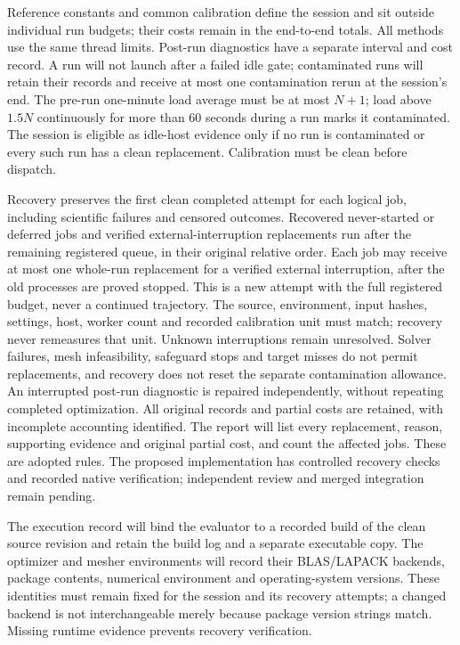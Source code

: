 Reference constants and common calibration define the session and sit outside
individual run budgets; their costs remain in the end-to-end totals.
All methods use the same thread limits. Post-run diagnostics have a separate
interval and cost record. A run will not launch after a failed idle gate; contaminated runs
will retain their records and receive at most one contamination rerun at the
session's end. The pre-run
one-minute load average must be at most $N+1$; load above $1.5N$ continuously
for more than 60 seconds during a run marks it contaminated. The session is
eligible as idle-host evidence only if no run is contaminated or every such
run has a clean replacement. Calibration must be clean before dispatch.

Recovery preserves the first clean completed attempt for each logical job,
including scientific failures and censored outcomes. Recovered never-started
or deferred jobs and verified external-interruption replacements run after
the remaining registered queue, in their original relative order. Each job
may receive at most one whole-run replacement for a verified external
interruption, after the old processes are proved stopped. This is a new
attempt with the full registered budget, never a continued trajectory.
The source, environment, input hashes, settings, host, worker count and
recorded calibration unit must match; recovery never remeasures that unit.
Unknown interruptions remain unresolved. Solver failures, mesh infeasibility,
safeguard stops and target misses do not permit replacements, and recovery
does not reset the separate contamination allowance. An interrupted post-run
diagnostic is repaired independently, without repeating completed optimization.
All original records and partial costs are retained, with incomplete accounting
identified. The report will list every replacement, reason, supporting evidence
and original partial cost, and count the affected jobs. These are adopted
rules. The proposed implementation has controlled recovery checks and
recorded native verification; independent review and merged integration
remain pending.

The execution record will bind the evaluator to a recorded build of the clean
source revision and retain the build log and a separate executable copy.
The optimizer and mesher environments will record their BLAS/LAPACK backends,
package contents, numerical environment and operating-system versions.
These identities must remain fixed for the session and its recovery attempts;
a changed backend is not interchangeable merely because package version strings
match. Missing runtime evidence prevents recovery verification.

